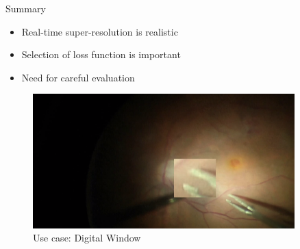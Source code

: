 \documentclass{beamer}
\begin{document}
\begin{frame}{Summary}
\begin{itemize}
  \item Real-time super-resolution is realistic
  \item Selection of loss function is important
  \item Need for careful evaluation
\end{itemize}
\begin{figure}[h]
  \centering
\includegraphics[width=0.9\textwidth]{digitalwindow_screen}
  \caption*{Use case: Digital Window}
\end{figure}
\end{frame}
\end{document}
